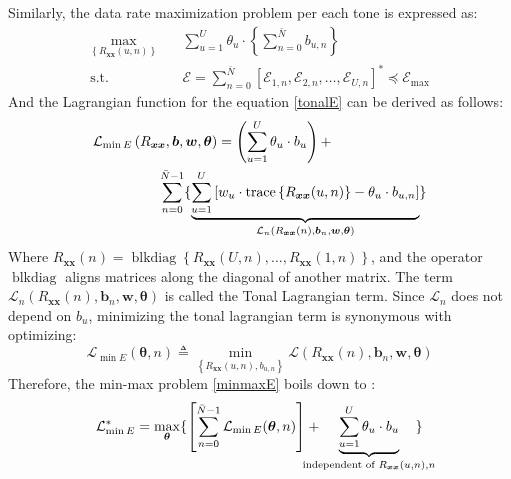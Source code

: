 Similarly, the data rate maximization problem per each tone is expressed as:
\begin{equation}
\begin{aligned}
\max_{\left\{R_{\boldsymbol{x} \boldsymbol{x}}{(u, n)}\right\}} \quad &\sum_{u=1}^U \theta_u \cdot\left\{\sum_{n=0}^{\bar{N}} b_{u, n}\right\} \\
\textrm{s.t.} \quad &\mathcal{E}=\sum_{n=0}^{\bar{N}}\left[\mathcal{E}_{1, n}, \mathcal{E}_{2, n}, \ldots, \mathcal{E}_{U, n}\right]^* \preceq \boldsymbol{\mathcal{E}}_{\max }
\end{aligned}
\end{equation}
And the Lagrangian function for the equation \ref{tonalE} can be derived as follows:
\begin{equation} \label{minmaxE}
\begin{aligned}
\mathcal{L}_{\min E}\left(R_{\boldsymbol{x} \boldsymbol{x}}, \boldsymbol{b}, \boldsymbol{w}, \boldsymbol{\theta}\right)&=\left(\sum_{u=1}^U \theta_u \cdot b_u\right)
+ \\
& \hspace{-1.5cm} \sum_{n=0}^{\bar{N}-1}\{\underbrace{\sum_{u=1}^U\left[w_u \cdot \operatorname{trace}\left\{R_{\boldsymbol{x} \boldsymbol{x}}(u, n)\right\}-\theta_u \cdot b_{u, n}\right]}_{\mathcal{L}_n\left(R_{\boldsymbol{x} \boldsymbol{x}}(n), \boldsymbol{b}_n, \boldsymbol{w}, \boldsymbol{\theta}\right)}\}
\end{aligned}
\end{equation}
Where $R_{\boldsymbol{x} \boldsymbol{x}}(n)=\operatorname{blkdiag}\left\{R_{\boldsymbol{x} \boldsymbol{x}}(U, n), \ldots, R_{\boldsymbol{x} \boldsymbol{x}}(1, n)\right\}$, and the operator $\operatorname{blkdiag}$ aligns matrices along the diagonal of another matrix. The term $\mathcal{L}_n\left(R_{\boldsymbol{x} \boldsymbol{x}}(n), \boldsymbol{b}_n, \boldsymbol{w}, \boldsymbol{\theta}\right)$ is called the Tonal Lagrangian term. Since $\mathcal{L}_n$ does not depend on $b_u$, minimizing the tonal lagrangian term is synonymous with optimizing: 
\begin{equation}
\mathcal{L}_{\min E}(\boldsymbol{\theta}, n) \triangleq \min _{\left\{R_{\boldsymbol{xx}}(u, n), b_{u, n}\right\}} \mathcal{L}\left(R_{\boldsymbol{xx}}(n), \boldsymbol{b}_n, \boldsymbol{w}, \boldsymbol{\theta}\right)    
\end{equation}
Therefore, the min-max problem \ref{minmaxE} boils down to :
\begin{equation} \label{final}
\mathcal{L}_{\min E}^*=\max _{\boldsymbol{\theta}}\{\left[\sum_{n=0}^{\bar{N}-1} \mathcal{L}_{\min E}(\boldsymbol{\theta}, n)\right]+\hspace{-0.5cm}\underbrace{\sum_{u=1}^U \theta_u \cdot b_u}_{\text {independent of } R_{\boldsymbol{xx}}(u, n), n}\hspace{-0.5cm}\}
\end{equation}



